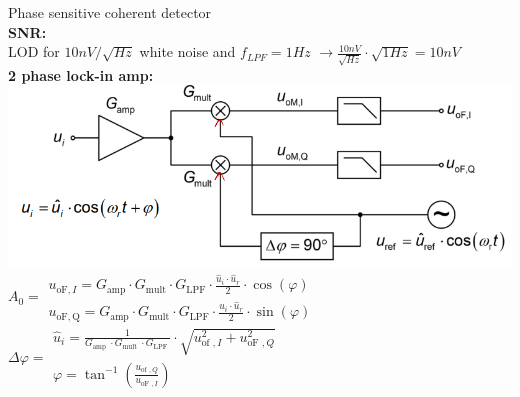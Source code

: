 \documentclass[5pt,landscape]{article}
\begin{document}
\begin{multicols*}{5}
Phase sensitive coherent detector\\
\textbf{SNR:}\\
LOD for $ 10nV/ \sqrt{Hz} $ white noise and $ f_{LPF} = 1Hz$ $ \rightarrow \frac{10nV}{\sqrt{Hz}} \cdot \sqrt{1Hz} = 10nV$\\
\textbf{2 phase lock-in amp:}\\
\includegraphics[width=\columnwidth]{images/two_phase_lockin.png}\\
$A_0 = \begin{array}{l}
u_{\mathrm{oF}, I}=G_{\mathrm{amp}} \cdot G_{\mathrm{mult}} \cdot G_{\mathrm{LPF}} \cdot \frac{\hat{u}_{i} \cdot \hat{u}_{r}}{2} \cdot \cos (\varphi) \\
u_{\mathrm{oF}, \mathrm{Q}}=G_{\mathrm{amp}} \cdot G_{\mathrm{mult}} \cdot G_{\mathrm{LPF}} \cdot \frac{\hat{u}_{i} \cdot \hat{u}_{r}}{2} \cdot \sin (\varphi)
\end{array} $\\
$ \Delta \varphi =\begin{array}{l}
\hat{u}_{i}=\frac{1}{G_{\text {amp }} \cdot G_{\text {mult }} \cdot G_{\text {LPF }}} \cdot \sqrt{u_{\text {of }, I}^{2}+u_{\text {oF }, Q}^{2}} \\
\varphi=\tan ^{-1}\left(\frac{u_{\text {of }, Q}}{u_{\text {oF }, I}}\right)
\end{array} $\\

\end{multicols*}
\end{document}
